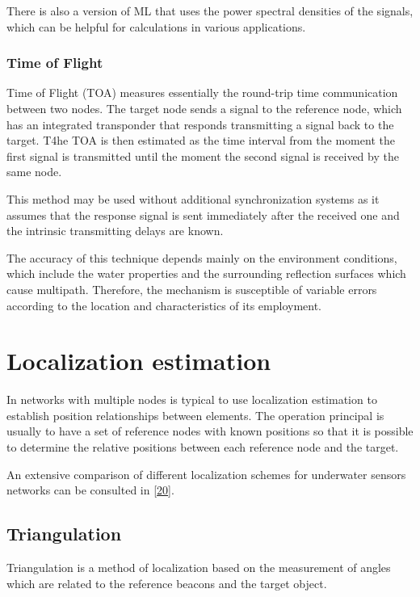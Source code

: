 There is also a version of ML that uses the power spectral densities of the signals, which can be helpful for calculations in various applications. 

\subsubsection{Time of Flight}

Time of Flight (TOA) measures essentially the round-trip time communication between two nodes. The target node sends a signal to the reference node, which has an integrated transponder that responds transmitting a signal back to the target. T4he TOA is then estimated as the time interval from the moment the first signal is transmitted until the moment the second signal is received by the same node. 

This method may be used without additional synchronization systems as it assumes that the response signal is sent immediately after the received one and the intrinsic transmitting delays are known.

The accuracy of this technique depends mainly on the environment conditions, which include the water properties and the surrounding reflection surfaces which cause multipath. Therefore, the mechanism is susceptible of variable errors according to the location and characteristics of its employment.


\section{Localization estimation}

In networks with multiple nodes is typical to use localization estimation to establish position relationships between elements. The operation principal is usually to have a set of reference nodes with known positions so that it is possible to determine the relative positions between each reference node and the target. 

An extensive comparison of different localization schemes for underwater sensors networks can be consulted in [\hyperref[r:r20]{20}].

\subsection{Triangulation}

Triangulation is a method of localization based on the measurement of angles which are related to the reference beacons and the target object. 

